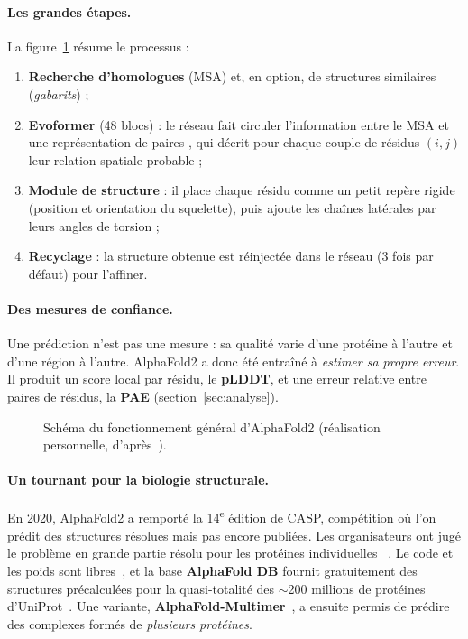 \paragraph{Les grandes étapes.} La figure~\ref{fig:schema} résume le processus :
\begin{enumerate}
  \item \textbf{Recherche d'homologues} (MSA) et, en option, de structures similaires (\emph{gabarits}) ;
  \item \textbf{Evoformer} (48 blocs) : le réseau fait circuler l'information entre le MSA et une \og représentation de paires \fg{}, qui décrit pour chaque couple de résidus $(i,j)$ leur relation spatiale probable ;
  \item \textbf{Module de structure} : il place chaque résidu comme un petit repère rigide (position et orientation du squelette), puis ajoute les chaînes latérales par leurs angles de torsion ;
  \item \textbf{Recyclage} : la structure obtenue est réinjectée dans le réseau (3 fois par défaut) pour l'affiner.
\end{enumerate}

\paragraph{Des mesures de confiance.} Une prédiction n'est pas une mesure : sa qualité varie d'une protéine à l'autre et d'une région à l'autre. AlphaFold2 a donc été entraîné à \emph{estimer sa propre erreur}. Il produit un score local par résidu, le \textbf{pLDDT}, et une erreur relative entre paires de résidus, la \textbf{PAE} (section~\ref{sec:analyse}).

\begin{figure}[H]
  \centering
  \resizebox{\textwidth}{!}{}
  \caption{Schéma du fonctionnement général d'AlphaFold2 (réalisation personnelle, d'après~\cite{jumper2021,ebi_course}).}
  \label{fig:schema}
\end{figure}

\paragraph{Un tournant pour la biologie structurale.} En 2020, AlphaFold2 a remporté la 14\textsuperscript{e} édition de CASP, compétition où l'on prédit des structures résolues mais pas encore publiées. Les organisateurs ont jugé le problème \og en grande partie résolu pour les protéines individuelles \fg{}~\cite{kryshtafovych2021}. Le code et les poids sont libres~\cite{alphafold_github}, et la base \textbf{AlphaFold DB} fournit gratuitement des structures précalculées pour la quasi-totalité des $\sim$200 millions de protéines d'UniProt~\cite{varadi2022}. Une variante, \textbf{AlphaFold-Multimer}~\cite{evans2021}, a ensuite permis de prédire des complexes formés de \emph{plusieurs protéines}.

